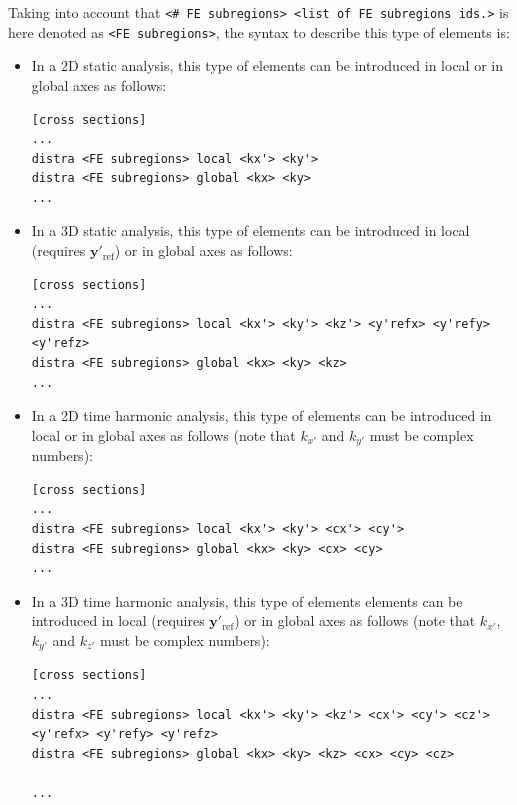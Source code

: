 \documentclass[a4paper,fleqn]{book}
\begin{document}
Taking into account that \texttt{<\# FE subregions> <list of FE subregions ids.>} is here denoted as \texttt{<FE subregions>}, the syntax to describe this type of elements is:
\begin{itemize}

\item In a 2D static analysis, this type of elements can be introduced in local or in global axes as follows:
\begin{Verbatim}[frame=single, fontsize=\small, label={format of section [cross sections] for distra elements}]
[cross sections]
...
distra <FE subregions> local <kx'> <ky'>
distra <FE subregions> global <kx> <ky>
...
\end{Verbatim}  

\item In a 3D static analysis, this type of elements can be introduced in local (requires $\mathbf{y}'_\mathrm{ref}$) or in global axes as follows:
\begin{Verbatim}[frame=single, fontsize=\small, label={format of section [cross sections] for distra elements}]
[cross sections]
...
distra <FE subregions> local <kx'> <ky'> <kz'> <y'refx> <y'refy> <y'refz>
distra <FE subregions> global <kx> <ky> <kz>
...
\end{Verbatim}

\item In a 2D time harmonic analysis, this type of elements can be introduced in local or in global axes as follows (note that $k_{x'}$ and $k_{y'}$ must be complex numbers):
\begin{Verbatim}[frame=single, fontsize=\small, label={format of section [cross sections] for distra elements}]
[cross sections]
...
distra <FE subregions> local <kx'> <ky'> <cx'> <cy'>
distra <FE subregions> global <kx> <ky> <cx> <cy>
...
\end{Verbatim} 

\item In a 3D time harmonic analysis, this type of elements elements can be introduced in local (requires $\mathbf{y}'_\mathrm{ref}$) or in global axes as follows (note that $k_{x'}$, $k_{y'}$ and $k_{z'}$ must be complex numbers):
\begin{Verbatim}[frame=single, fontsize=\footnotesize, label={format of section [cross sections] for distra elements}]
[cross sections]
...
distra <FE subregions> local <kx'> <ky'> <kz'> <cx'> <cy'> <cz'> <y'refx> <y'refy> <y'refz>
distra <FE subregions> global <kx> <ky> <kz> <cx> <cy> <cz>

...
\end{Verbatim}

\end{itemize}
\end{document}
